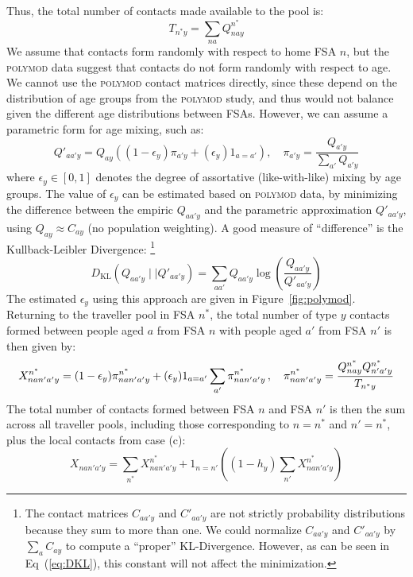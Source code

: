 \documentclass{article}
\begin{document}
  Thus, the total number of contacts made available to the pool is:
  \begin{equation}
    T_{n^*y} = \sum_{na} Q^{n^*}_{nay}
  \end{equation}
  We assume that contacts form randomly with respect to home FSA $n$,
  but the \textsc{polymod} data suggest that contacts do not form randomly with respect to age.
  We cannot use the \textsc{polymod} contact matrices directly,
  since these depend on the distribution of age groups from the \textsc{polymod} study,
  and thus would not balance given the different age distributions between FSAs.
  However, we can assume a parametric form for age mixing, such as:
  \begin{equation}
    Q'_{aa'y} = Q_{ay} \left( (1 - \epsilon_y) \pi_{a'y} + (\epsilon_y) 1_{a=a'} \right),\quad
    \pi_{a'y} = \frac{Q_{a'y}}{\sum_{a'}Q_{a'y}}
    \label{eq:eps}
  \end{equation}
  where $\epsilon_y \in [0,1]$ denotes the degree of assortative (like-with-like) mixing by age groups.
  The value of $\epsilon_y$ can be estimated based on \textsc{polymod} data,
  by minimizing the difference between the empiric $Q_{aa'y}$ and the parametric approximation $Q'_{aa'y}$,
  using $Q_{ay} \approx C_{ay}$ (no population weighting).
  A good measure of ``difference'' is the Kullback-Leibler Divergence:%
  \footnote{The contact matrices $C_{aa'y}$ and $C'_{aa'y}$ are not strictly probability distributions
    because they sum to more than one.
    We could normalize $C_{aa'y}$ and $C'_{aa'y}$ by $\sum_a C_{ay}$ to compute a ``proper'' KL-Divergence.
    However, as can be seen in Eq~(\ref{eq:DKL}), this constant will not affect the minimization.}
  \begin{equation}
    D_{\textrm{KL}}(Q_{aa'y} \mid\mid Q'_{aa'y}) = \sum_{aa'} Q_{aa'y} \log{\left(\frac{Q_{aa'y}}{Q'_{aa'y}}\right)}
    \label{eq:DKL}
  \end{equation}
  The estimated $\epsilon_y$ using this approach are given in Figure~\ref{fig:polymod}.
  Returning to the traveller pool in FSA $n^*$,
  the total number of type $y$ contacts formed between people aged $a$ from FSA $n$
  with people aged $a'$ from FSA $n'$ is then given by:
  \begin{equation}
    X^{n^*}_{nan'a'y} =
      (1-\epsilon_y) \pi^{n^*}_{nan'a'y} +
        (\epsilon_y) 1_{a=a'} \sum_{a'} \pi^{n^*}_{nan'a'y}
    \thinspace,\quad
    \pi^{n^*}_{nan'a'y} = \frac{Q^{n^*}_{nay} Q^{n^*}_{n'a'y}}{T_{n^*y}}
  \end{equation}
  The total number of contacts formed between FSA $n$ and FSA $n'$ is then
  the sum across all traveller pools, including those corresponding to $n=n^*$ and $n'=n^*$,
  plus the local contacts from case (c):
  \begin{equation}
    X_{nan'a'y} = \sum_{n^*} X^{n^*}_{nan'a'y} + 1_{n=n'}\left( (1-h_y) \sum_{n'} X^{n^*}_{nan'a'y} \right)
  \end{equation}
\end{document}
